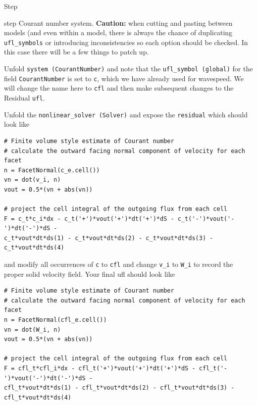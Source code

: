 \begin{steps}{Step}
\begin{steps}{step}
    Courant number system. \textbf{Caution:} when cutting and pasting
    between models (and even within a model, there is always the
    chance of duplicating \texttt{ufl\_symbols} or introducing
    inconsistencies so each option should be checked. In this case
    there will be a few things to patch up.
  \item Unfold \texttt{system (CourantNumber)} and note that the
    \texttt{ufl\_symbol (global)} for the field \texttt{CourantNumber}
    is set to \texttt{c}, which we have already used for wavespeed.
    We will change the name here to \texttt{cfl} and then make
    subsequent changes to the Residual \texttt{ufl}.
  \item Unfold the \texttt{nonlinear\_solver (Solver)} and expose the
    \texttt{residual} which should look like
    \begin{lstlisting}[style=UFL]
# Finite volume style estimate of Courant number
# calculate the outward facing normal component of velocity for each facet
n = FacetNormal(c_e.cell())
vn = dot(v_i, n)
vout = 0.5*(vn + abs(vn))

# project the cell integral of the outgoing flux from each cell
F = c_t*c_i*dx - c_t('+')*vout('+')*dt('+')*dS - c_t('-')*vout('-')*dt('-')*dS - 
c_t*vout*dt*ds(1) - c_t*vout*dt*ds(2) - c_t*vout*dt*ds(3) - c_t*vout*dt*ds(4)
    \end{lstlisting}
and modify all occurrences of \texttt{c} to \texttt{cfl} and change
\texttt{v\_i} to \texttt{W\_i} to record the proper solid velocity
field.  Your final ufl should look like
\pagebreak{}
\begin{lstlisting}[style=UFL]
# Finite volume style estimate of Courant number
# calculate the outward facing normal component of velocity for each facet
n = FacetNormal(cfl_e.cell())
vn = dot(W_i, n)
vout = 0.5*(vn + abs(vn))

# project the cell integral of the outgoing flux from each cell
F = cfl_t*cfl_i*dx - cfl_t('+')*vout('+')*dt('+')*dS - cfl_t('-')*vout('-')*dt('-')*dS -
cfl_t*vout*dt*ds(1) - cfl_t*vout*dt*ds(2) - cfl_t*vout*dt*ds(3) - cfl_t*vout*dt*ds(4)
\end{lstlisting}


  \end{steps}



\end{steps}

